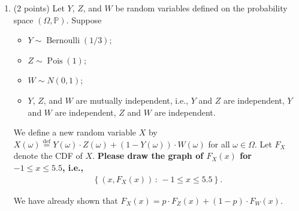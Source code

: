 \documentclass[11pt]{article}
\newcommand{\1}{\mathbbm{1}}
\newcommand{\p}{\mathbb{P}}
\begin{document}
\begin{enumerate}
\begin{proof}
    By the law of total probability,
    \[F_X(x)=\p(X\leq x\mid Y=1)\cdot \p(Y=1)+\p(X\leq x\mid Y=0)\cdot \p(Y=0)\]
    We will now compute each half of the sum.
    \begin{align*}
        \p(X\leq x\mid Y=1)\cdot \p(Y=1) &= \p(YZ+(1-Y)W\leq x\mid Y=1)\cdot \p(Y=1)\\
        &= \p(1\cdot Z+(1-1)W\leq x)\cdot \p(Y=1)\\
        &= \p(Z\leq x)\cdot \p(Y=1)\\
        &= p\cdot F_Z(x)
    \end{align*}
    \begin{align*}
        \p(X\leq x\mid Y=0)\cdot \p(Y=0) &= \p(YZ+(1-Y)W\leq x\mid Y=0)\cdot \p(Y=0)\\
        &= \p(0\cdot Z+(1-0)W\leq x)\cdot \p(Y=0)\\
        &= \p(W\leq x)\cdot \p(Y=0)\\
        &= (1-p)\cdot F_W(x)
    \end{align*}
    Together, we have \(F_X(x)=p\cdot F_Z(x)+(1-p)\cdot F_W(x)\).
\end{proof}

\item (2 points) Let $Y$, $Z$, and $W$ be random variables defined on the probability space $(\Omega,\mathbb{P})$. Suppose
    \begin{itemize}
        \item $Y\sim\operatorname{Bernoulli}(1/3)$;
        \item $Z\sim \operatorname{Pois}(1)$;
        \item $W\sim N(0,1)$;
        \item $Y$, $Z$, and $W$ are mutually independent, i.e., $Y$ and $Z$ are independent, $Y$ and $W$ are independent, $Z$ and $W$ are independent.
    \end{itemize} 
    We define a new random variable $X$ by $X(\omega)\overset{\operatorname{def}}{=} Y(\omega)\cdot Z(\omega) + (1-Y(\omega))\cdot W(\omega)$ for all $\omega\in\Omega$. Let $F_X$ denote the CDF of $X$. \textbf{Please draw the graph of $F_X(x)$ for $-1\le x\le 5.5$, i.e., }
    \begin{align*}
        \left\{\left(x, F_X(x)\right) \,:\, -1\le x\le 5.5\right\}.
    \end{align*}

    We have already shown that \(F_X(x)=p\cdot F_Z(x)+(1-p)\cdot F_W(x)\). 
    

\end{enumerate}
\end{document}
